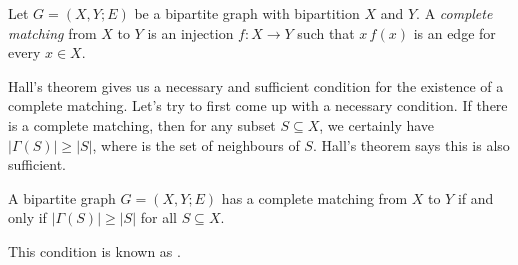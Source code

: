 \documentclass[a4paper]{article}
\begin{document}
\begin{defi}
  Let $G = (X, Y; E)$ be a bipartite graph with bipartition $X$ and $Y$. A \emph{complete matching} from $X$ to $Y$ is an injection $f: X \to Y$ such that $x\, f(x)$ is an edge for every $x \in X$.
\end{defi}

Hall's theorem gives us a necessary and sufficient condition for the existence of a complete matching. Let's try to first come up with a necessary condition. If there is a complete matching, then for any subset $S \subseteq X$, we certainly have $|\Gamma(S)| \geq |S|$, where  is the set of neighbours of $S$. Hall's theorem says this is also sufficient.

\begin{thm}[Hall, 1935]
  A bipartite graph $G = (X, Y; E)$ has a complete matching from $X$ to $Y$ if and only if $|\Gamma(S)| \geq |S|$ for all $S \subseteq X$.
\end{thm}
This condition is known as .
\end{document}
